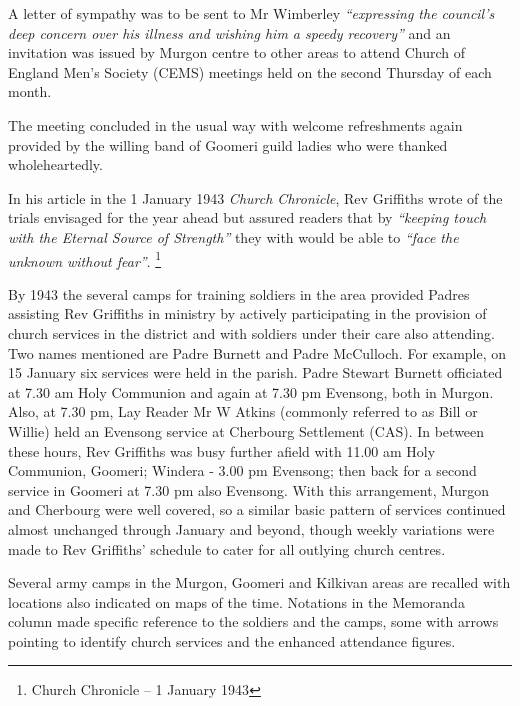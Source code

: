 A letter of sympathy was to be sent to Mr Wimberley \emph{``expressing the council's deep concern over his illness and wishing him a speedy recovery''} and an invitation was issued by Murgon centre to other areas to attend Church of England Men's Society (CEMS) meetings held on the second Thursday of each month.



The meeting concluded in the usual way with welcome refreshments again provided by the willing band of Goomeri guild ladies who were thanked wholeheartedly.



In his article in the 1 January 1943 \emph{Church Chronicle}, Rev Griffiths wrote of the trials envisaged for the year ahead but assured readers that by \emph{``keeping touch with the Eternal Source of Strength''} they with would be able to \emph{``face the unknown without fear''}. \footnote{Church Chronicle -- 1 January 1943}


By 1943 the several camps for training soldiers in the area provided Padres assisting Rev Griffiths in ministry by actively participating in the provision of church services in the district and with soldiers under their care also attending. Two names mentioned are Padre Burnett and Padre McCulloch. For example, on 15 January six services were held in the parish. Padre Stewart Burnett officiated at 7.30 am Holy Communion and again at 7.30 pm Evensong, both in Murgon. Also, at 7.30 pm, Lay Reader Mr W Atkins (commonly referred to as Bill or Willie) held an Evensong service at Cherbourg Settlement (CAS). In between these hours, Rev Griffiths was busy further afield with 11.00 am Holy Communion, Goomeri; Windera - 3.00 pm Evensong; then back for a second service in Goomeri at 7.30 pm also Evensong. With this arrangement, Murgon and Cherbourg were well covered, so a similar basic pattern of services continued almost unchanged through January and beyond, though weekly variations were made to Rev Griffiths' schedule to cater for all outlying church centres.



Several army camps in the Murgon, Goomeri and Kilkivan areas are recalled with locations also indicated on maps of the time. Notations in the Memoranda column made specific reference to the soldiers and the camps, some with arrows pointing to identify church services and the enhanced attendance figures.



